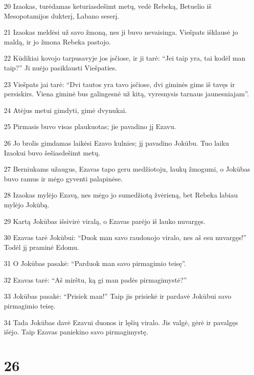 \par 20 Izaokas, turėdamas keturiasdešimt metų, vedė Rebeką, Betuelio iš Mesopotamijos dukterį, Labano seserį. 
\par 21 Izaokas meldėsi už savo žmoną, nes ji buvo nevaisinga. Viešpats išklausė jo maldą, ir jo žmona Rebeka pastojo. 
\par 22 Kūdikiai kovojo tarpusavyje jos įsčiose, ir ji tarė: “Jei taip yra, tai kodėl man taip?” Ji nuėjo pasiklausti Viešpaties. 
\par 23 Viešpats jai tarė: “Dvi tautos yra tavo įsčiose, dvi giminės gims iš tavęs ir persiskirs. Viena giminė bus galingesnė už kitą, vyresnysis tarnaus jaunesniajam”. 
\par 24 Atėjus metui gimdyti, gimė dvynukai. 
\par 25 Pirmasis buvo visas plaukuotas; jie pavadino jį Ezavu. 
\par 26 Jo brolis gimdamas laikėsi Ezavo kulnies; jį pavadino Jokūbu. Tuo laiku Izaokui buvo šešiasdešimt metų. 
\par 27 Berniukams užaugus, Ezavas tapo geru medžiotoju, laukų žmogumi, o Jokūbas buvo ramus ir mėgo gyventi palapinėse. 
\par 28 Izaokas mylėjo Ezavą, nes mėgo jo sumedžiotą žvėrieną, bet Rebeka labiau mylėjo Jokūbą. 
\par 29 Kartą Jokūbas išsivirė viralą, o Ezavas parėjo iš lauko nuvargęs. 
\par 30 Ezavas tarė Jokūbui: “Duok man savo raudonojo viralo, nes aš esu nuvargęs!” Todėl jį praminė Edomu. 
\par 31 O Jokūbas pasakė: “Parduok man savo pirmagimio teisę”. 
\par 32 Ezavas tarė: “Aš mirštu, ką gi man padės pirmagimystė?” 
\par 33 Jokūbas pasakė: “Prisiek man!” Taip jis prisiekė ir pardavė Jokūbui savo pirmagimio teisę. 
\par 34 Tada Jokūbas davė Ezavui duonos ir lęšių viralo. Jis valgė, gėrė ir pavalgęs išėjo. Taip Ezavas paniekino savo pirmagimystę.



\chapter{26}

